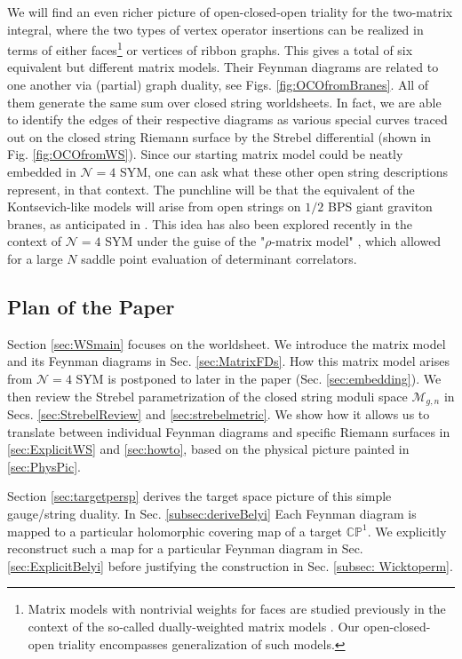 \documentclass[english]{article}
\renewcommand{\>}{\rangle}
\newcommand{\<}{\langle}
\renewcommand{\(}{\left(}
\renewcommand{\)}{\right)}
\begin{document}
We will find an even richer picture of open-closed-open triality for the two-matrix integral, where the two types of vertex operator insertions can be realized in terms of either faces\footnote{Matrix models with nontrivial weights for faces are studied previously in the context of the so-called dually-weighted matrix models \cite{Kazakov:1995ae,Das:1989fq}. Our open-closed-open triality encompasses generalization of such models.} or vertices of ribbon graphs.  This gives a total of six equivalent but different matrix models. Their Feynman diagrams are related to one another via (partial) graph duality, see Figs. \ref{fig:OCOfromBranes}. All of them generate the same sum over closed string worldsheets. In fact, we are able to identify the edges of their respective diagrams as various special curves traced out on the closed string Riemann surface by the Strebel differential (shown in Fig. \ref{fig:OCOfromWS}).  
Since our starting matrix model could be neatly embedded in $\mathcal{N}=4$ SYM, one can ask what these other open string descriptions represent, in that context. The punchline will be that the equivalent of the Kontsevich-like models will arise from open strings on $1/2$ BPS giant graviton branes, as anticipated in \cite{Joburg,brown2011complex}. This idea has also been explored recently in the context of $\mathcal{N}=4$ SYM under the guise of the "$\rho$-matrix model" \cite{komatsuOCO, Caron-Huot:2023wdh}, which allowed for a large $N$ saddle point evaluation of determinant correlators. 

\subsection{Plan of the Paper}

Section \ref{sec:WSmain} focuses on the worldsheet. We introduce the matrix model and its Feynman diagrams in Sec. \ref{sec:MatrixFDs}. How this matrix model arises from $\mathcal{N}=4$ SYM is postponed to later in the paper (Sec. \ref{sec:embedding}). We then review the Strebel parametrization of the closed string moduli space $\mathcal{M}_{g,n}$ in Secs. \ref{sec:StrebelReview} and \ref{sec:strebelmetric}. We show how it allows us to translate between individual Feynman diagrams and specific Riemann surfaces in \ref{sec:ExplicitWS} and \ref{sec:howto}, based on the physical picture painted in \ref{sec:PhysPic}.

Section \ref{sec:targetpersp} derives the target space picture of this simple gauge/string duality. In Sec. \ref{subsec:deriveBelyi} Each Feynman diagram is mapped to a particular holomorphic covering map of a target $\mathbb{CP}^{1}$. We explicitly reconstruct such a map for a particular Feynman diagram in Sec. \ref{sec:ExplicitBelyi} before justifying the construction in Sec. \ref{subsec: Wicktoperm}.
\end{document}
